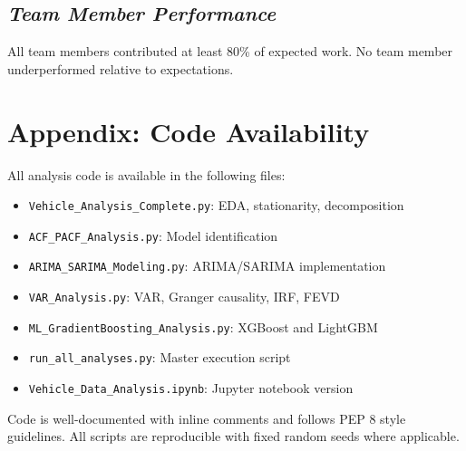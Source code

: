 \documentclass[12pt]{article}
\begin{document}
\subsection*{\textit{Team Member Performance}}

All team members contributed at least 80\% of expected work. No team member underperformed relative to expectations.

\section*{\textbf{Appendix: Code Availability}}

All analysis code is available in the following files:
\begin{itemize}
    \item \texttt{Vehicle\_Analysis\_Complete.py}: EDA, stationarity, decomposition
    \item \texttt{ACF\_PACF\_Analysis.py}: Model identification
    \item \texttt{ARIMA\_SARIMA\_Modeling.py}: ARIMA/SARIMA implementation
    \item \texttt{VAR\_Analysis.py}: VAR, Granger causality, IRF, FEVD
    \item \texttt{ML\_GradientBoosting\_Analysis.py}: XGBoost and LightGBM
    \item \texttt{run\_all\_analyses.py}: Master execution script
    \item \texttt{Vehicle\_Data\_Analysis.ipynb}: Jupyter notebook version
\end{itemize}

Code is well-documented with inline comments and follows PEP 8 style guidelines. All scripts are reproducible with fixed random seeds where applicable.
\end{document}
